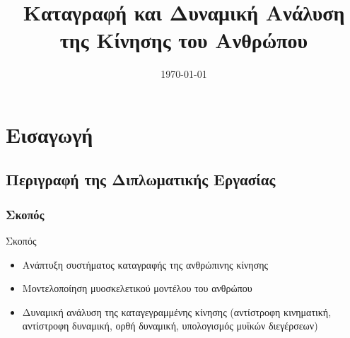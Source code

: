 \documentclass[8pt,sans,mathserif,aspectratio=43]{beamer}%
\title[Καταγραφή και Δυναμική Ανάλυση της Κίνησης του Ανθρώπου]{Καταγραφή και Δυναμική Ανάλυση της Κίνησης του Ανθρώπου}
\institute[ΗΜ\&ΤΥ]{
{\large\textsc{Πανεπιστήμιο Πατρών \\
Τμήμα Ηλεκτρολόγων Μηχανικών και Τεχνολογίας Υπολογιστών}}\\[1cm]
{\large\eng{Stanev Dimitar}}\\
\medskip
\textit{\eng{jimstanev@gmail.com}} %
}
\date{\today} %
\begin{document}

\begin{frame}
\titlepage %
\end{frame}


\section{Εισαγωγή}
\frame{\tableofcontents[currentsection]}
\subsection{Περιγραφή της Διπλωματικής Εργασίας}
\begin{frame}
\frametitle{Σκοπός}

    \begin{block}{Σκοπός}
        \begin{itemize}
            \item Ανάπτυξη συστήματος καταγραφής της ανθρώπινης κίνησης
            \item Μοντελοποίηση μυοσκελετικού μοντέλου του ανθρώπου
            \item Δυναμική ανάλυση της καταγεγραμμένης κίνησης (αντίστροφη κινηματική, αντίστροφη δυναμική, ορθή δυναμική, υπολογισμός μυϊκών διεγέρσεων)
        \end{itemize}
    \end{block}
    
\end{frame}
\end{document}

